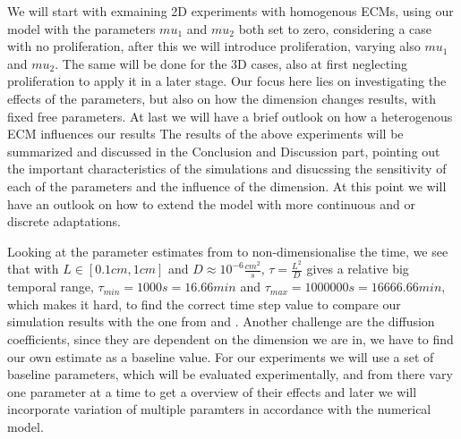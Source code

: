 We will start with exmaining 2D experiments with homogenous ECMs, using our model with the parameters $mu_1$ and $mu_2$ both set to zero, considering a case with no proliferation, after this we will introduce proliferation, varying also $mu_1$ and $mu_2$. The same will be done for the 3D cases, also at first neglecting proliferation to apply it in a later stage. Our focus here lies on investigating the effects of the parameters, but also on how the dimension changes results, with fixed free parameters. At last we will have a brief outlook on how a heterogenous ECM influences our results\newline
The results of the above experiments will be summarized and discussed in the Conclusion and Discussion part, pointing out the important characteristics of the simulations and disucssing the sensitivity of each of the parameters and the influence of the dimension. At this point we will have an outlook on how to extend the model with more continuous and or discrete adaptations. \newline \newline

Looking at the parameter estimates from \cite{anderson_mathematical_2000} to non-dimensionalise the time, we see that with $L \in [0.1cm,1cm]$ and $D\approx 10^{-6}\frac{cm^2}{s}$, $\tau = \frac{L^2}{D}$ gives a relative big temporal range, $\tau_{min} = 1000s = 16.66 min$ and $\tau_{max} = 1000000s = 16666.66min$, which makes it hard, to find the correct time step value to compare our simulation results with the one from \cite{anderson_mathematical_2000} and \cite{Kolev2010}. Another challenge are the diffusion coefficients, since they are dependent on the dimension we are in, we have to find our own estimate as a baseline value. \newline 
For our experiments we will use a set of baseline parameters, which will be evaluated experimentally, and from there vary one parameter at a time to get a overview of their effects and later we will incorporate variation of multiple paramters in accordance with the numerical model. 



